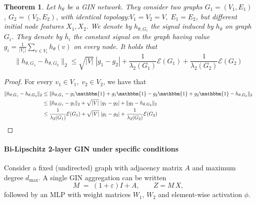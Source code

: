 \documentclass[11pt]{article}\usepackage{amsmath,amssymb,amsthm,bbm}
\newtheorem{theorem}{Theorem}
\newcommand{\EE}{\mathcal{E}}
\newcommand{\1}{\mathbbm{1}}
\begin{document}
\begin{theorem}
    Let $ h_{\theta} $ be a GIN network. They consider two graphs $G_1 = (V_1, E_1) $, $G_2 = (V_2, E_2) $, with identical topology:$V_1 = V_2 = V, \; E_1 = E_2$, but different initial node features $X_1, X_2$.
    We denote by \( h_{\theta,G_i} \) the signal induced by $h_{\theta}$ on graph $G_i$. 
They denote by \(\bar{h}_i \) the constant signal on the graph having value \( g_i = \frac{1}{|V_i|}\sum_{v \in V_i} h_{\theta}(v) \) on every node.  It holds that 
\[ \| h_{\theta,G_1} - h_{\theta,G_2}\|_2 \leq \sqrt{|V|}  \; |  g_1 -  g_2| + \frac{1}{\lambda_2(G_1)} \EE(G_1)  + \frac{1}{\lambda_2(G_2)} \EE(G_2) \]
\end{theorem}
\begin{proof}
For every $v_1 \in V_1, \; v_2 \in V_2$, we have that
    \begin{align}
       \| h_{\theta,G_1} - h_{\theta,G_2}\|_2 &\leq \|h_{\theta,G_1}  -  g_1 \1 +  g_1 \1 -  g_2 \1 +  g_2\1  - h_{\theta,G_2} \|_2 \\
        & \leq \| h_{\theta,G_1} -  g_1\|_2 + \sqrt{|V|} \; |  g_1 -  g_2|  + \| g_2  - h_{\theta,G_2}\|_2\\
        & \leq \frac{1}{\lambda_2(G_1)} \EE(G_1) + \sqrt{|V|} \; |  g_1 -  g_2|  + \frac{1}{\lambda_2(G_2)} \EE(G_2)
    \end{align}

    
\end{proof}


\paragraph{Bi-Lipschitz  2-layer GIN under specific conditions}

Consider a fixed (undirected) graph with adjacency matrix \(A\) and maximum degree \(d_{\max}\).
A single GIN aggregation can be written
\[
M \;=\; (1+\varepsilon)I + A, 
\qquad
Z = M\,X ,
\]
followed by an MLP with weight matrices \(W_1,\,W_2\) and element-wise activation
\(\phi\).
\end{document}
